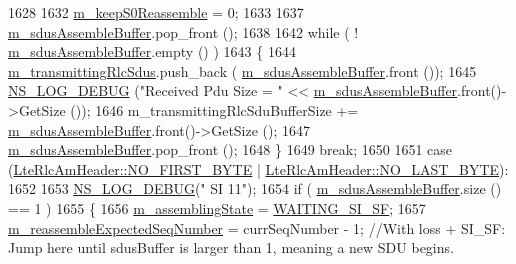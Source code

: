 \begin{DoxyCode}
1628 
1632                               \hyperlink{classns3_1_1LteRlcAm_ab3240ea3468d9b515fc38e717273d3bd}{m\_keepS0Reassemble} = 0;
1633 
1637                               \hyperlink{classns3_1_1LteRlcAm_a075262ee7d8d49e97ab0c48b5e763bf1}{m\_sdusAssembleBuffer}.pop\_front ();
1638 
1642                               \textcolor{keywordflow}{while} ( ! \hyperlink{classns3_1_1LteRlcAm_a075262ee7d8d49e97ab0c48b5e763bf1}{m\_sdusAssembleBuffer}.empty () )
1643                                 \{
1644                                   \hyperlink{classns3_1_1LteRlcAm_a941fac42e27a28f35b0eea1a02c0595f}{m\_transmittingRlcSdus}.push\_back (
      \hyperlink{classns3_1_1LteRlcAm_a075262ee7d8d49e97ab0c48b5e763bf1}{m\_sdusAssembleBuffer}.front ());
1645                                   \hyperlink{group__logging_ga413f1886406d49f59a6a0a89b77b4d0a}{NS\_LOG\_DEBUG} (\textcolor{stringliteral}{"Received Pdu Size = "} << 
      \hyperlink{classns3_1_1LteRlcAm_a075262ee7d8d49e97ab0c48b5e763bf1}{m\_sdusAssembleBuffer}.front()->GetSize ());
1646                                   m\_transmittingRlcSduBufferSize += 
      \hyperlink{classns3_1_1LteRlcAm_a075262ee7d8d49e97ab0c48b5e763bf1}{m\_sdusAssembleBuffer}.front()->GetSize ();
1647                                   \hyperlink{classns3_1_1LteRlcAm_a075262ee7d8d49e97ab0c48b5e763bf1}{m\_sdusAssembleBuffer}.pop\_front ();
1648                                 \}
1649                       \textcolor{keywordflow}{break};
1650 
1651                       \textcolor{keywordflow}{case} (\hyperlink{classns3_1_1LteRlcAmHeader_af42d22f1202bd0d8fa1f4cd0494b8b29a32b741f4f0b7c331632c185341ac9cb4}{LteRlcAmHeader::NO\_FIRST\_BYTE} | 
      \hyperlink{classns3_1_1LteRlcAmHeader_af0fb4ccf208128c7cf9dcabf02593749af3f3cbb1727324b59b486aa955ce28f8}{LteRlcAmHeader::NO\_LAST\_BYTE}):
1652 
1653                               \hyperlink{group__logging_ga413f1886406d49f59a6a0a89b77b4d0a}{NS\_LOG\_DEBUG}(\textcolor{stringliteral}{" SI 11"});
1654                               \textcolor{keywordflow}{if} ( \hyperlink{classns3_1_1LteRlcAm_a075262ee7d8d49e97ab0c48b5e763bf1}{m\_sdusAssembleBuffer}.size () == 1 )
1655                                 \{
1656                                   \hyperlink{classns3_1_1LteRlcAm_ab6d2954b419df60fc8f8df012fa2709c}{m\_assemblingState} = 
      \hyperlink{classns3_1_1LteRlcAm_a43eeebdccf778e2247c956481ed03d62a967f9c81a213f824b6a908bdfc1a7e4e}{WAITING\_SI\_SF};
1657                                   \hyperlink{classns3_1_1LteRlcAm_a98a0e0d29fe1254e55ac9b029d7b9934}{m\_reassembleExpectedSeqNumber} = 
      currSeqNumber - 1; \textcolor{comment}{//With loss + SI\_SF: Jump here until sdusBuffer is larger than 1, meaning a new SDU begins.}

\end{DoxyCode}
